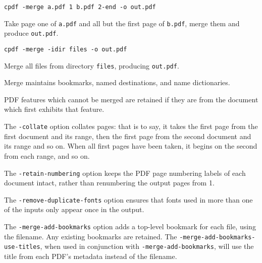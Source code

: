 \documentclass{book}
\begin{document}
  \begin{framed}\small
    \verb!cpdf -merge a.pdf 1 b.pdf 2-end -o out.pdf!

    \vspace{2.5mm}
    \noindent Take page one of \texttt{a.pdf} and all but the first page of
\texttt{b.pdf}, merge them and produce \texttt{out.pdf}.

    \vspace{1.5mm}
    \verb!cpdf -merge -idir files -o out.pdf!

    \vspace{2.5mm}
    \noindent Merge all files from directory \texttt{files}, producing \texttt{out.pdf}.

  \end{framed}

\noindent Merge maintains bookmarks, named destinations, and name dictionaries.

PDF features which cannot be merged are retained if they are from
the document which first exhibits that feature.

The \texttt{-collate} option collates pages: that is to say, it takes the first page from the first document and its range, then the first page from the second document and its range and so on. When all first pages have been taken, it begins on the second from each range, and so on.

The \texttt{-retain-numbering} option keeps the PDF page numbering labels of
each document intact, rather than renumbering the output pages from 1.

The \texttt{-remove-duplicate-fonts} option ensures that fonts used in more than one
of the inputs only appear once in the output.

The \texttt{-merge-add-bookmarks} option adds a top-level bookmark for each file, using the filename. Any existing bookmarks are retained. The \texttt{-merge\--add\--bookmarks\--use\--titles}, when used in conjunction with \texttt{-merge-add-bookmarks}, will use the title from each PDF's metadata instead of the filename.
\end{document}
